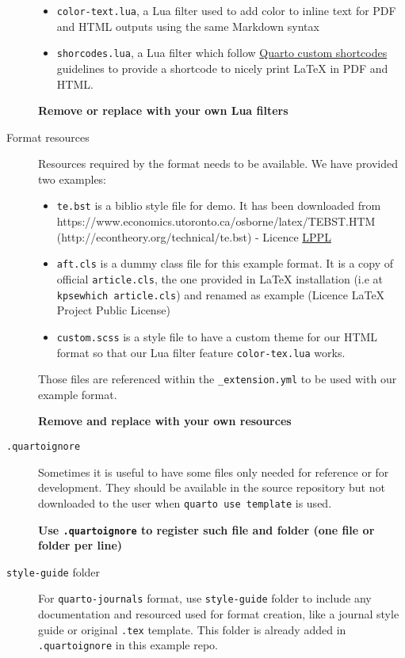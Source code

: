 \documentclass[manuscript,screen,review]{acmart}
\providecommand{\tightlist}{%
  \setlength{\itemsep}{0pt}\setlength{\parskip}{0pt}}\usepackage{longtable,booktabs,array}
\begin{document}
\begin{description}
\begin{itemize}
\tightlist
\item
  \texttt{color-text.lua}, a Lua filter used to add color to inline text
  for PDF and HTML outputs using the same Markdown syntax
\item
  \texttt{shorcodes.lua}, a Lua filter which follow
  \href{https://quarto.org/docs/authoring/shortcodes.html\#custom-shortcodes}{Quarto
  custom shortcodes} guidelines to provide a \texttt{} shortcode to
  nicely print LaTeX in PDF and HTML.
\end{itemize}

\textbf{Remove or replace with your own Lua filters}
\item[Format resources]
Resources required by the format needs to be available. We have provided
two examples:

\begin{itemize}
\tightlist
\item
  \texttt{te.bst} is a biblio style file for demo. It has been
  downloaded from
  https://www.economics.utoronto.ca/osborne/latex/TEBST.HTM
  (http://econtheory.org/technical/te.bst) - Licence
  \href{https://www.latex-project.org/lppl/}{LPPL}
\item
  \texttt{aft.cls} is a dummy class file for this example format. It is
  a copy of official \texttt{article.cls}, the one provided in LaTeX
  installation (i.e at \texttt{kpsewhich\ article.cls}) and renamed as
  example (Licence LaTeX Project Public License)
\item
  \texttt{custom.scss} is a style file to have a custom theme for our
  HTML format so that our Lua filter feature \texttt{color-tex.lua}
  works.
\end{itemize}

Those files are referenced within the \texttt{\_extension.yml} to be
used with our example format.

\textbf{Remove and replace with your own resources}
\item[\texttt{.quartoignore}]
Sometimes it is useful to have some files only needed for reference or
for development. They should be available in the source repository but
not downloaded to the user when \texttt{quarto\ use\ template} is used.

\textbf{Use \texttt{.quartoignore} to register such file and folder (one
file or folder per line)}
\item[\texttt{style-guide} folder]
For \texttt{quarto-journals} format, use \texttt{style-guide} folder to
include any documentation and resourced used for format creation, like a
journal style guide or original \texttt{.tex} template. This folder is
already added in \texttt{.quartoignore} in this example repo.


\end{description}
\end{document}
